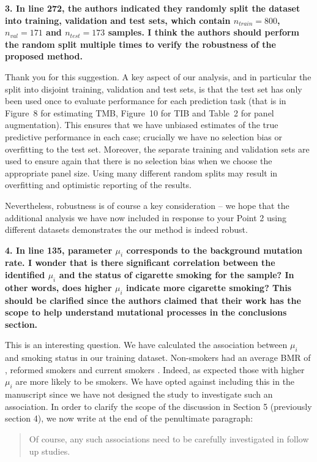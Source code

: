 \documentclass[12pt]{article}
\begin{document}

\textbf{3. In line 272, the authors indicated they randomly split the dataset into training, validation and test sets, which contain $n_{train} = 800$, $n_{val} = 171$ and $n_{test} = 173$ samples. I think the authors should perform the random split multiple times to verify the robustness of the proposed method.}

Thank you for this suggestion. A key aspect of our analysis, and in particular the split into disjoint training, validation and test sets, is that the test set has only been used once to evaluate performance for each prediction task (that is in Figure~8 for estimating TMB, Figure~10 for TIB and Table~2 for panel augmentation). This ensures that we have unbiased estimates of the true predictive performance in each case; crucially we have no selection bias or overfitting to the test set. Moreover, the separate training and validation sets are used to ensure again that there is no selection bias when we choose the appropriate panel size. Using many different random splits may result in overfitting and optimistic reporting of the results.  

Nevertheless, robustness is of course a key consideration -- we hope that the additional analysis we have now included in response to your Point 2 using different datasets demonstrates the our method is indeed robust. 

\textbf{4. In line 135, parameter $\mu_i$ corresponds to the background mutation rate. I wonder that is there significant correlation between the identified $\mu_i$ and the status of cigarette smoking for the sample? In other words, does higher $\mu_i$ indicate more cigarette smoking? This should be clarified since the authors claimed that their work has the scope to help understand mutational processes in the conclusions section.}

This is an interesting question.  We have calculated the association between $\mu_i$ and smoking status in our training dataset. Non-smokers had an average BMR of , reformed smokers  and current smokers . Indeed, as expected those with higher $\mu_i$ are more likely to be smokers.  We have opted against including this in the manuscript since we have not designed the study to investigate such an association. In order to clarify the scope of the discussion in Section 5 (previously section 4), we now write at the end of the penultimate paragraph:
\begin{quotation}
Of course, any such associations need to be carefully investigated in follow up studies.
\end{quotation}
\end{document}
